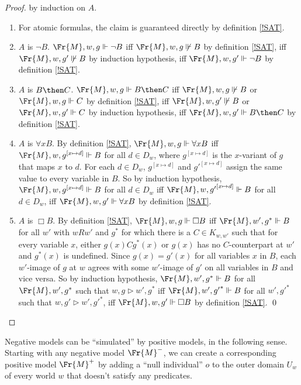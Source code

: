 \documentclass[11pt]{woarticle}
\theoremstyle{break}
\theoremstyle{nonumberplain}
\newcommand{\SAT}{\Vdash}
\newcommand{\Img}{\triangleright}
\newcommand{\1}{\;\,|\;\,}
\begin{document}
\begin{proof}
  by induction on $A$. 
  \begin{enumerate}
    \item For atomic formulas, the claim is guaranteed directly by definition
          \ref{!SAT}.
    \item $A$ is $\neg B$.\; $\Fr{M},w,g \SAT \neg B$ iff
          $\Fr{M},w,g \not\SAT B$ by definition \ref{!SAT}, iff
          $\Fr{M},w,g' \not\SAT B$ by induction hypothesis, iff
          $\Fr{M},w,g' \SAT \neg B$ by definition \ref{!SAT}.
    \item $A$ is $B \then C$.\; $\Fr{M},w,g \SAT B \then C$ iff
          $\Fr{M},w,g \not\SAT B$ or $\Fr{M},w,g \SAT C$ by definition
          \ref{!SAT}, iff $\Fr{M},w,g' \not\SAT B$ or $\Fr{M},w,g' \SAT C$ by
          induction hypothesis, iff $\Fr{M},w,g' \SAT B \then C$ by definition
          \ref{!SAT}.
    \item $A$ is $\forall x B$.\; By definition \ref{!SAT},
          $\Fr{M},w,g \SAT \forall x B$ iff $\Fr{M},w,g^{[x\mapsto d]} \SAT B$
          for all $d \in D_{w}$, where $g^{[x\mapsto d]}$ is the $x$-variant of
          $g$ that maps $x$ to $d$. For each $d \in D_{w}$, $g^{[x\mapsto d]}$
          and ${g'}^{[x\mapsto d]}$ assign the same value to every variable in
          $B$. So by induction hypothesis, $\Fr{M},w,g^{[x\mapsto d]} \SAT B$
          for all $d \in D_{w}$ iff $\Fr{M},w,{g'}^{[x\mapsto d]} \SAT B$ for
          all $d \in D_{w}$, iff $\Fr{M},w,g' \SAT \forall x B$ by definition
          \ref{!SAT}.
    \item $A$ is $\Box B$.\; By definition \ref{!SAT}, $\Fr{M},w,g \SAT \Box B$
          iff $\Fr{M},w',g^{*} \SAT B$ for all $w'$ with $wRw'$ and $g^{*}$ for which
          there is a $C \in K_{w,w'}$ such that for every variable $x$, either
          $g(x)Cg^{*}(x)$ or $g(x)$ has no $C$-counterpart at $w'$ and $g^{*}(x)$ is
          undefined. Since $g(x) = g'(x)$ for all variables $x$ in $B$, each $w'$-image
          of $g$ at $w$ agrees with some $w'$-image of $g'$ on all variables in
          $B$ and vice versa. So by induction hypothesis, $\Fr{M},w',g^{*} \SAT B$
          for all $\Fr{M},w',g^{*}$ such that $w,g \Img w',g^{*}$ iff
          $\Fr{M},w',{g'}^{*} \SAT B$ for all $w',{g'}^*$ such that $w,g' \Img w',{g'}^{*}$, iff
          $\Fr{M},w,g' \SAT \Box B$ by definition \ref{!SAT}. \qed
  \end{enumerate}
\end{proof}

Negative models can be ``simulated'' by positive models, in the following sense.
Starting with any negative model $\Fr{M}^{-}$, we can create a corresponding
positive model $\Fr{M}^{+}$ by adding a ``null individual'' $o$ to the outer
domain $U_w$ of every world $w$ that doesn't satisfy any predicates.
\end{document}
